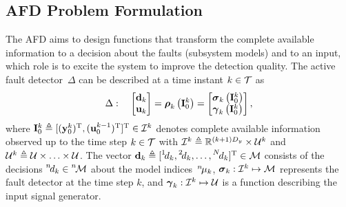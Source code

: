 \documentclass[conference,10pt]{IEEEtran}
\def\ist{\prescript{1\!}{}}
\def\iind{\prescript{2\!}{}}
\def\nth{\prescript{n\!}{}}
\def\Nth{\prescript{N\!}{}}
\begin{document}
\subsection{AFD Problem Formulation}\label{sec:AFD_problem_formulation}
The AFD aims to design functions that transform the complete available information to a decision about the faults (subsystem models) and to an input, which role is to excite the system to improve the detection quality. 
The active fault detector~$\Delta$ can be described at a time instant $k\in\mathcal{T}$ as
\begin{align}\label{ali:AFDsystem}
  \Delta:\quad
  \begin{bmatrix}
    \mathbf{d}_{k}\\ \mathbf{u}_{k}
  \end{bmatrix} = 
  \boldsymbol{\rho}_{k}\left(\mathbf{I}_{0}^{k}\right) =
  \begin{bmatrix}
    \boldsymbol{\sigma}_{k}\left( \mathbf{I}_0^k\right)\\ \boldsymbol{\gamma}_{k}\left(\mathbf{I}_{0}^{k}\right)
  \end{bmatrix},
\end{align}
where $\mathbf{I}_0^k\triangleq[(\mathbf{y}_{0}^{k})^{\text{T}},(\mathbf{u}_{0}^{k-1})^{\text{T}}]^{\text{T}}\in\mathcal{I}^k$ denotes complete available information observed up to the time step $k\in\mathcal{T}$ with $\mathcal{I}^{k}\triangleq\mathbb{R}^{(k+1)D_y}\times\mathcal{U}^{k}$ and $\mathcal{U}^{k}\triangleq\mathcal{U}\times\ldots\times\mathcal{U}$. 
The vector $\bfd_{k}\triangleq[\ist{d}_k,\iind{d}_k,\ldots,\Nth{d}_k]^{\T}\in\mcM$ consists of the  decisions $\nth{d}_k\in\nth{\mcM}$ about the model indices~$\nth{\mu}_k$, $\boldsymbol{\sigma}_{k}:\mathcal{I}^{k} \mapsto \mathcal{M}$ represents the fault detector at the time step $k$, and $\boldsymbol{\gamma}_{k}:\mathcal{I}^{k} \mapsto \mathcal{U}$ is a function describing the input signal generator. 
\end{document}
